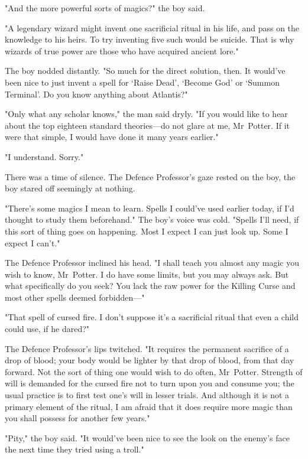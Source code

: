 "And the more powerful sorts of magics?" the boy said.

"A legendary wizard might invent one sacrificial ritual in his life, and pass
on the knowledge to his heirs. To try inventing five such would be suicide.
That is why wizards of true power are those who have acquired ancient lore."

The boy nodded distantly. "So much for the direct solution, then. It would've
been nice to just invent a spell for `Raise Dead', `Become God' or `Summon
Terminal'. Do you know anything about Atlantis?"

"Only what any scholar knows," the man said dryly. "If you would like to hear
about the top eighteen standard theories---do not glare at me, Mr~Potter. If
it were that simple, I would have done it many years earlier."

"I understand. Sorry."

There was a time of silence. The Defence Professor's gaze rested on the boy,
the boy stared off seemingly at nothing.

"There's some magics I mean to learn. Spells I could've used earlier today, if
I'd thought to study them beforehand." The boy's voice was cold. "Spells I'll
need, if this sort of thing goes on happening. Most I expect I can just look
up. Some I expect I can't."

The Defence Professor inclined his head. "I shall teach you almost any magic
you wish to know, Mr~Potter. I do have some limits, but you may always ask.
But what specifically do you seek? You lack the raw power for the Killing Curse
and most other spells deemed forbidden---"

"That spell of cursed fire. I don't suppose it's a sacrificial ritual that even
a child could use, if he dared?"

The Defence Professor's lips twitched. "It requires the permanent sacrifice of
a drop of blood; your body would be lighter by that drop of blood, from that
day forward. Not the sort of thing one would wish to do often, Mr~Potter.
Strength of will is demanded for the cursed fire not to turn upon you and
consume you; the usual practice is to first test one's will in lesser trials.
And although it is not a primary element of the ritual, I am afraid that it
does require more magic than you shall possess for another few years."

"Pity," the boy said. "It would've been nice to see the look on the enemy's
face the next time they tried using a troll."

